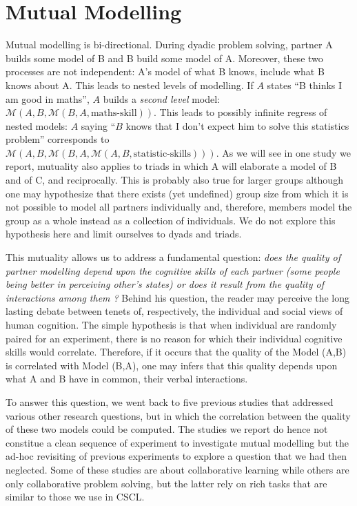 \documentclass[natbib]{svjour3}
\newcommand{\M}[3]{{\mathcal{M}(#1, #2, #3)}}
\newcommand{\model}[3]{{$\mathcal{M}(#1, #2, #3)$}}
\begin{document}
\section{Mutual Modelling}

Mutual modelling is bi-directional. During dyadic problem solving,   partner A
builds some model of B and B build some model of A.  Moreover, these two
processes are not independent: A's model of what B knows, include what B knows
about A.  This leads to nested levels of  modelling. If $A$ states ``B thinks I
am good in maths'', $A$ builds a \emph{second level} model:
\model{A}{B}{\M{B}{A}{\text{maths-skill}}}. This leads to possibly infinite
regress of nested models: $A$ saying ``$B$ knows that I don't expect him to
solve this statistics problem'' corresponds to \\
\model{A}{B}{\M{B}{A}{\M{A}{B}{\text{statistic-skills}}}}.  As we will see in
one study we report, mutuality also applies to triads in which A will elaborate
a model of B and of C, and reciprocally. This is probably also true for larger
groups although one may hypothesize that there exists (yet undefined) group size
from which it is not possible to model all partners individually and, therefore,
members  model  the group as a whole instead as a collection of individuals.  We
do not explore this hypothesis here and limit ourselves to dyads and triads.

This mutuality allows us to address a fundamental question: \emph{does the
quality of partner modelling depend upon the cognitive skills of each partner
(some people being better in perceiving other's states) or does it result from
the quality of interactions among them ?} Behind his question, the reader may
perceive the long lasting debate between tenets of, respectively, the individual
and social views of human cognition.  The simple hypothesis is that when
individual are randomly paired for an experiment, there is no reason for which
their individual cognitive skills would correlate. Therefore, if it occurs that
the quality of the Model (A,B) is correlated with Model (B,A), one may infers
that this quality depends upon what A and B have in common, their verbal
interactions. 

To answer this question, we went back to five previous studies that addressed
various other research questions, but in which the correlation between the
quality of these two models could be computed.  The studies we report do hence
not constitue a clean sequence of experiment to investigate mutual modelling but
the ad-hoc revisiting of previous experiments to explore a question that we had
then neglected. Some of these studies are about collaborative learning while
others are only collaborative problem solving, but the latter rely on rich tasks
that are similar to those we use in CSCL.
\end{document}
